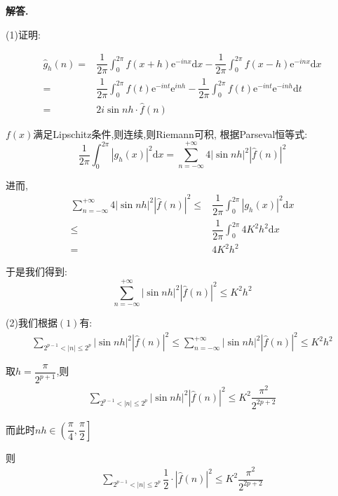 \documentclass[12pt, a4paper, oneside]{ctexart}
\newenvironment{solution}{\par\noindent\textbf{解答. }}{\par}
\begin{document}
\begin{solution}
\par
(1)证明:
\par
$$
\begin{aligned}
\hat{g}_h(n)=&\dfrac{1}{2\pi}\int_{0}^{2\pi}f(x+h)\mathrm{e}^{-inx}\mathrm{d}x
-\dfrac{1}{2\pi}\int_{0}^{2\pi}f(x-h)\mathrm{e}^{-inx}\mathrm{d}x\\
=& \dfrac{1}{2\pi}\int_{0}^{2\pi}f(t)\mathrm{e}^{-int}\mathrm{e}^{inh}-
\dfrac{1}{2\pi}\int_{0}^{2\pi}f(t)\mathrm{e}^{-int}\mathrm{e}^{-inh}\mathrm{d}t\\
=&2i\sin nh \cdot \hat{f}(n)
\end{aligned}
$$
\par
$f(x)$满足Lipschitz条件,则连续,则Riemann可积,
根据Parseval恒等式:
$$
\dfrac{1}{2\pi}\int_{0}^{2\pi}\left|g_h(x)\right|^2\mathrm{d}x=\sum_{n=-\infty}^{+\infty}
4\left|\sin nh\right|^2\left|\hat{f}(n)\right|^2
$$
\par
进而,
$$
\begin{aligned}
\sum_{n=-\infty}^{+\infty}
4\left|\sin nh\right|^2\left|\hat{f}(n)\right|^2
\leqslant &\dfrac{1}{2\pi}\int_{0}^{2\pi}\left|g_h(x)\right|^2\mathrm{d}x\\
\leqslant &\dfrac{1}{2\pi}\int_{0}^{2\pi}4K^2h^2\mathrm{d}x\\
= &4K^2h^2
\end{aligned}
$$
\par
于是我们得到:
$$
\sum_{n=-\infty}^{+\infty}
\left|\sin nh\right|^2\left|\hat{f}(n)\right|^2
\leqslant  K^2h^2
$$
\par
(2)我们根据$(1)$有:
$$
\begin{aligned}
\sum_{2^{p-1}<|n|\leqslant 2^p}|\sin nh|^2\left|\hat{f}(n)\right|^2
\leqslant
\sum_{n=-\infty}^{+\infty}
\left|\sin nh\right|^2\left|\hat{f}(n)\right|^2
\leqslant  K^2h^2
\end{aligned}
$$
\par
取$h=\dfrac{\pi}{2^{p+1}}$,则
$$
\begin{aligned}
    \sum_{2^{p-1}<|n|\leqslant 2^p}|\sin nh|^2\left|\hat{f}(n)\right|^2
    \leqslant  K^2\dfrac{\pi^2}{2^{2p+2}}
    \end{aligned}
$$
\par
而此时$nh \in \left(\dfrac{\pi}{4},\dfrac{\pi}{2}\right]$
\par
则
$$
\begin{aligned}
    \sum_{2^{p-1}<|n|\leqslant 2^p}\dfrac{1}{2}\cdot\left|\hat{f}(n)\right|^2
    \leqslant  K^2\dfrac{\pi^2}{2^{2p+2}}
    \end{aligned}
$$
\end{solution}
\end{document}
